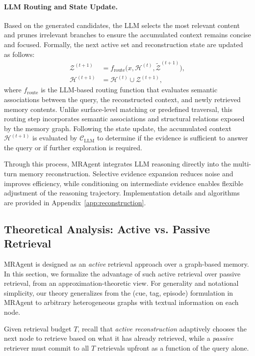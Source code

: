 \paragraph{LLM Routing and State Update.}
Based on the generated candidates, the LLM selects the most relevant content and prunes irrelevant branches to ensure the accumulated context remains concise and focused.
Formally, the next active set and reconstruction state are updated as follows:
\begin{equation}
\begin{aligned}
\mathcal{Z}^{(t+1)}
&=
f_{\text{route}}\!\big(
x, \mathcal{H}^{(t)}, \widetilde{\mathcal{Z}}^{(t+1)}
\big), \\
\mathcal{H}^{(t+1)}
&=
\mathcal{H}^{(t)} \cup \mathcal{Z}^{(t+1)} ,
\end{aligned}
\end{equation}
where $f_{\text{route}}$ is the LLM-based routing function that evaluates semantic associations between the query, the reconstructed context, and newly retrieved memory contents.
Unlike surface-level matching or predefined traversal, this routing step  incorporates semantic associations and structural relations exposed by the memory graph. Following the state update, the accumulated context $\mathcal{H}^{(t+1)}$ is evaluated by $\mathcal{C}_{\text{LLM}}$ to determine if the evidence is sufficient to answer the query or if further exploration is required.

Through this process, MRAgent integrates LLM reasoning directly into the multi-turn memory reconstruction. 
Selective evidence expansion reduces noise and improves efficiency, while
conditioning on intermediate evidence enables flexible adjustment of the
reasoning trajectory.
Implementation details and algorithms are provided in Appendix~\ref{app:reconstruction}.

\subsection{Theoretical Analysis: Active vs. Passive Retrieval}
\label{subsec:theory}
MRAgent is designed as an \emph{active} retrieval approach over a graph-based memory. In this section, we formalize the advantage of such active retrieval over passive retrieval, from an approximation-theoretic view. 
For generality and notational simplicity, our theory generalizes from the (cue, tag, episode) formulation in MRAgent to arbitrary heterogeneous graphs with textual information on each node.

Given retrieval budget \(T\), recall that \emph{active reconstruction} adaptively chooses the next node to retrieve based on what it has already retrieved, while a
\emph{passive} retriever must commit to all \(T\) retrievals upfront as a function of the query alone.

